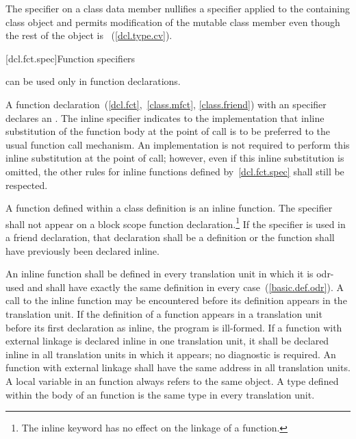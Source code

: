 \pnum
The  specifier on a class data member nullifies a
 specifier applied to the containing class object and
permits modification of the mutable class member even though the rest of
the object is ~(\ref{dcl.type.cv}).

[dcl.fct.spec]{Function specifiers}%
%

\pnum
{}
can be used only in function declarations.

\begin{bnf}
\br
    \br
    \br
\end{bnf}

\pnum
{}%
%
A function declaration~(\ref{dcl.fct},~\ref{class.mfct},
\ref{class.friend}) with an  specifier declares an
. The inline specifier indicates to
the implementation that inline substitution of the function body at the
point of call is to be preferred to the usual function call mechanism.
An implementation is not required to perform this inline substitution at
the point of call; however, even if this inline substitution is omitted,
the other rules for inline functions defined by~\ref{dcl.fct.spec} shall
still be respected.

\pnum
A function defined within a class definition is an inline function. The
 specifier shall not appear on a block scope function
declaration.\footnote{The inline keyword has no effect on the linkage of a function.}
If the  specifier is used in a friend declaration, that
declaration shall be a definition or the function shall have previously
been declared inline.

\pnum
An inline function shall be defined in every translation unit in which
it is odr-used and shall have exactly the same definition in every
case~(\ref{basic.def.odr}).
\enternote
A call to the inline function may be encountered before its definition
appears in the translation unit.
\exitnote
If the definition of a function appears in a translation unit before its
first declaration as inline, the program is ill-formed. If a function
with external linkage is declared inline in one translation unit, it
shall be declared inline in all translation units in which it appears;
no diagnostic is required. An  function with external
linkage shall have the same address in all translation units. A
 local variable in an  
function always refers to the same object. 
A type defined within the body of an  function is the
same type in every translation unit.

